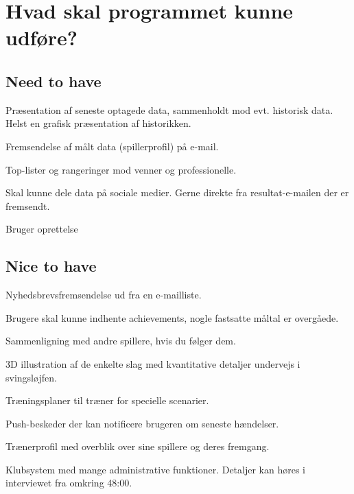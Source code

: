 \section*{Hvad skal programmet kunne udføre?}

\subsection*{Need to have}
Præsentation af seneste optagede data, sammenholdt mod evt. historisk data.
Helst en grafisk præsentation af historikken.

Fremsendelse af målt data (spillerprofil) på e-mail.

Top-lister og rangeringer mod venner og professionelle.

Skal kunne dele data på sociale medier. 
Gerne direkte fra resultat-e-mailen der er fremsendt.

Bruger oprettelse

\subsection*{Nice to have}
Nyhedsbrevsfremsendelse ud fra en e-mailliste.

Brugere skal kunne indhente achievements, nogle fastsatte måltal er overgåede.

Sammenligning med andre spillere, hvis du følger dem.

3D illustration af de enkelte slag med kvantitative detaljer undervejs i svingsløjfen.

Træningsplaner til træner for specielle scenarier.

Push-beskeder der kan notificere brugeren om seneste hændelser.

Trænerprofil med overblik over sine spillere og deres fremgang. 

Klubsystem med mange administrative funktioner.
Detaljer kan høres i interviewet fra omkring 48:00.
